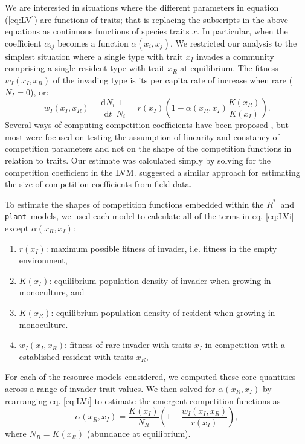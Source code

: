 \documentclass[a4paper,11pt]{article}
\newcommand{\ud}{\ensuremath{\mathrm{d}}}
\newcommand{\Rstar}{\ensuremath{R^*}}
\newcommand{\plant}{{\tt plant}}
\begin{document}
We are interested in situations where the different parameters in equation (\ref{eq:LV}) are functions of traits; that is replacing the subscripts in the above equations as continuous functions of species traits $x$. In particular, when the coefficient $\alpha_{ij}$ becomes a function $\alpha(x_i, x_j)$. We restricted our analysis to the simplest situation where a single type with trait $x_I$ invades a community comprising a single resident type with trait $x_R$ at equilibrium. The fitness $w_I(x_I, x_R)$ of the invading type is its per capita rate of increase when rare ($N_I = 0$), or: 
\begin{equation}\label{eq:LVi}
  w_I(x_I, x_R) = \frac{\ud N_i}{\ud t} \frac{1}{N_i} =
    r(x_I)\left(1 - \alpha(x_R, x_I) \frac{K(x_R)}{K(x_I)}\right).
\end{equation}
Several ways of computing competition coefficients have been proposed \citep[e.g.,][]{Abrams-1987,Abrams-2008}, but most were focused on testing the assumption of linearity and constancy of competition parameters and not on the shape of the competition functions in relation to traits. Our estimate was calculated simply by solving for the competition coefficient in the LVM. \citet{Ricklefs-1973} suggested a similar approach for estimating the size of competition coefficients from field data. 

To estimate the shapes of competition functions embedded within the \Rstar\ and \plant\ models, we used each model to calculate all of the terms in eq. \ref{eq:LVi} except $\alpha(x_R, x_I)$:
\begin{enumerate}
\item $r(x_I)$: maximum possible fitness of invader, i.e. fitness in the empty environment,
\item $K(x_I)$: equilibrium population density of invader when growing in monoculture, and
\item $K(x_R)$: equilibrium population density of resident when growing in monoculture.
\item $w_I(x_I, x_R)$: fitness of rare invader with traits $x_I$ in competition with a established resident with traits $x_R$,
\end{enumerate}

For each of the resource models considered, we computed these core quantities across a range of invader trait values. We then solved for $\alpha(x_R, x_I)$ by rearranging eq. \ref{eq:LVi} to estimate the emergent competition functions as
\begin{equation} \label{eq:alpha}
  \alpha(x_R, x_I) = \frac{K(x_I)}{N_R} \left(1 - \frac{w_I(x_I, x_R)}{r(x_I)}\right),
\end{equation}
where $N_R = K(x_R)$ (abundance at equilibrium). 
\end{document}

